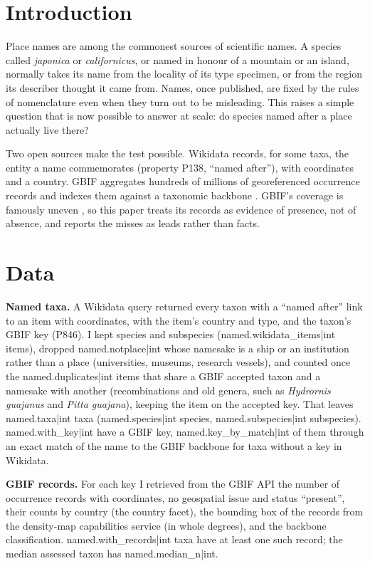 \documentclass[11pt,a4paper]{article}
\begin{document}
\section{Introduction}
Place names are among the commonest sources of scientific names. A species called \textit{japonica} or \textit{californicus}, or named in honour of a mountain or an island, normally takes its name from the locality of its type specimen, or from the region its describer thought it came from. Names, once published, are fixed by the rules of nomenclature even when they turn out to be misleading. This raises a simple question that is now possible to answer at scale: do species named after a place actually live there?

Two open sources make the test possible. Wikidata \citep{wikidata} records, for some taxa, the entity a name commemorates (property P138, ``named after''), with coordinates and a country. GBIF aggregates hundreds of millions of georeferenced occurrence records and indexes them against a taxonomic backbone \citep{gbif}. GBIF's coverage is famously uneven \citep{beck2014,meyer2016}, so this paper treats its records as evidence of presence, not of absence, and reports the misses as leads rather than facts.

\section{Data}
\textbf{Named taxa.} A Wikidata query returned every taxon with a ``named after'' link to an item with coordinates, with the item's country and type, and the taxon's GBIF key (P846). I kept species and subspecies ({{named.wikidata_items|int}} items), dropped {{named.notplace|int}} whose namesake is a ship or an institution rather than a place (universities, museums, research vessels), and counted once the {{named.duplicates|int}} items that share a GBIF accepted taxon and a namesake with another (recombinations and old genera, such as \textit{Hydrornis guajanus} and \textit{Pitta guajana}), keeping the item on the accepted key. That leaves {{named.taxa|int}} taxa ({{named.species|int}} species, {{named.subspecies|int}} subspecies). {{named.with_key|int}} have a GBIF key, {{named.key_by_match|int}} of them through an exact match of the name to the GBIF backbone for taxa without a key in Wikidata.

\textbf{GBIF records.} For each key I retrieved from the GBIF API the number of occurrence records with coordinates, no geospatial issue and status ``present'', their counts by country (the country facet), the bounding box of the records from the density-map capabilities service (in whole degrees), and the backbone classification. {{named.with_records|int}} taxa have at least one such record; the median assessed taxon has {{named.median_n|int}}.
\end{document}
